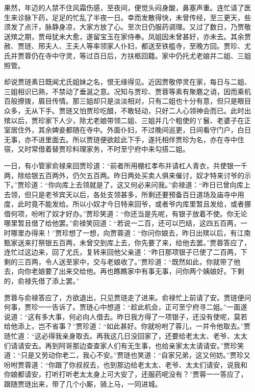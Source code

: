 \documentclass[12pt,oneside]{book}
\begin{document}
果然，年迈的人禁不住风霜伤感，至夜间，便觉头闷身酸，鼻塞声重。连忙请了医生来诊脉下药，足足的忙乱了半夜一日。幸而发散得快，未曾传经，至三更天，些须发了点汗，脉静身凉，大家方放了心。至次日仍服药调理。又过了数日，乃贾敬送殡之期，贾母犹未大愈，遂留宝玉在家侍奉。凤姐因未曾甚好，亦未去。其余贾赦、贾琏、邢夫人、王夫人等率领家人仆妇，都送至铁槛寺，至晚方回。贾珍、尤氏并贾蓉仍在寺中守灵，等过百日后，方扶柩回籍。家中仍托尤老娘并二姐、三姐照管。

却说贾琏素日既闻尤氏姐妹之名，恨无缘得见。近因贾敬停灵在家，每日与二姐、三姐相识已熟，不禁动了垂涎之意。况知与贾珍、贾蓉等素有聚麀之诮，因而乘机百般撩拨，眉目传情。那三姐却只是淡淡相对，只有二姐也十分有意，但只是眼目众多，无从下手。贾琏又怕贾珍吃醋，不敢轻动，只好二人心领神会而已。此时出殡以后，贾珍家下人少，除尤老娘带领二姐、三姐并几个粗使的丫鬟、老婆子在正室居住外，其余婢妾都随在寺中。外面仆妇，不过晚间巡更，日间看守门户，白日无事，亦不进里面去。所以贾琏便欲趁此下手，遂托相伴贾珍为名，亦在寺中住宿，又时常借着替贾珍料理家务，不时至宁府中来勾搭二姐。

一日，有小管家俞禄来回贾珍道：“前者所用棚杠孝布并请杠人青衣，共使银一千两，除给银五百两外，仍欠五百两。昨日两处买卖人俱来催讨，奴才特来讨爷的示下。”贾珍道：“你向库上去领就是了，这又何必来问我。”俞禄道：“昨日已曾向库上去领，但只是老爷宾天以后，各处支领甚多，所剩还要预备百日道场及庙寺中用度，此时竟不能发给。所以小奴才今日特来回爷，或者爷内库里暂且发给，或者挪借何项，吩咐了奴才好办。”贾珍笑道：“你还当是先呢，有银子放着不使。你无论哪里暂且借了给他罢。”俞禄笑回道：“若说一二百，还可以巴结，这四五百两，一时哪里办得来！”贾珍想了一想，向贾蓉道：“你问你娘去，昨日出殡以后，有江南甄家送来打祭银五百两，未曾交到库上去，你先要了来，给他去罢。”贾蓉答应了，连忙过这边来，回了尤氏，复转来回他父亲道：“昨日那项银子已使了二百两，下剩的三百两，令人送至家中，交与老娘收了。”贾珍道：“既然如此，你就带了他去，向你老娘要了出来交给他。再也瞧瞧家中有事无事，问你两个姨娘好。下剩的，俞禄先借了添上罢。”

贾蓉与俞禄答应了，方欲退出，只见贾琏走了进来。俞禄忙上前请了安。贾琏便问何事，贾珍一一告诉了。贾琏心中想道：“趁此机会，正可至宁府寻二姐。”一面遂说道：“这有多大事，何必向人借去。昨日我方得了一项银子，还没有使呢，莫若给他添上，岂不省事？”贾珍道：“如此甚好。你就吩咐了蓉儿，一并令他取去。”贾琏忙道：“这必得我亲身取去。再我这几日没回家了，还要给老太太、老爷、太太们请请安去。再到阿哥那边查查家人们有无生事，也给亲家太太请请安。”贾珍笑道：“只是又劳动你老二，我心不安。”贾琏也笑道：“自家兄弟，这又何妨。”贾珍又吩咐贾蓉道：“你跟了你叔叔去，也到那边给老太太、老爷、太太们请安，说我和你娘都请安，打听打听老太太身上可大安了，还服药呢没有？”贾蓉一一答应了，跟随贾琏出来，带了几个小厮，骑上马，一同进城。
\end{document}
